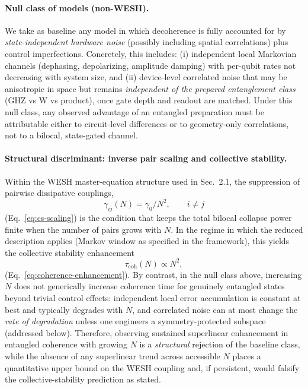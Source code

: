 \documentclass[12pt,a4paper]{article}
\numberwithin{equation}{section}
\begin{document}
\paragraph{Null class of models (non-WESH).}
We take as baseline any model in which decoherence is fully accounted for by
\emph{state-independent hardware noise} (possibly including spatial correlations)
plus control imperfections. Concretely, this includes:
(i) independent local Markovian channels (dephasing, depolarizing, amplitude damping)
with per-qubit rates not decreasing with system size, and
(ii) device-level correlated noise that may be anisotropic in space but remains
\emph{independent of the prepared entanglement class} (GHZ vs W vs product),
once gate depth and readout are matched.
Under this null class, any observed advantage of an entangled preparation must be
attributable either to circuit-level differences or to geometry-only correlations,
not to a bilocal, state-gated channel.

\paragraph{Structural discriminant: inverse pair scaling and collective stability.}
Within the WESH master-equation structure used in Sec.~2.1, the suppression of
pairwise dissipative couplings,
\begin{equation*}
\gamma_{ij}(N)=\gamma_0/N^2 , \qquad i\neq j
\end{equation*}
(Eq.~\eqref{eq:cs-scaling})
is the condition that keeps the total bilocal collapse power
finite when the number of pairs grows with $N$.
In the regime in which the reduced description applies (Markov window as specified
in the framework), this yields the collective stability enhancement
\begin{equation*}
\tau_{\mathrm{coh}}(N)\propto N^2 ,
\end{equation*}
(Eq.~\eqref{eq:coherence-enhancement}).
By contrast, in the null class above, increasing $N$ does not generically
increase coherence time for genuinely entangled states beyond trivial control effects:
independent local error accumulation is constant at best and typically degrades with $N$,
and correlated noise can at most change the \emph{rate of degradation} unless one engineers
a symmetry-protected subspace (addressed below).
Therefore, observing sustained superlinear enhancement in entangled coherence with growing $N$
is a \emph{structural} rejection of the baseline class, while the absence of any superlinear
trend across accessible $N$ places a quantitative upper bound on the WESH coupling
and, if persistent, would falsify the collective-stability prediction as stated.
\end{document}
